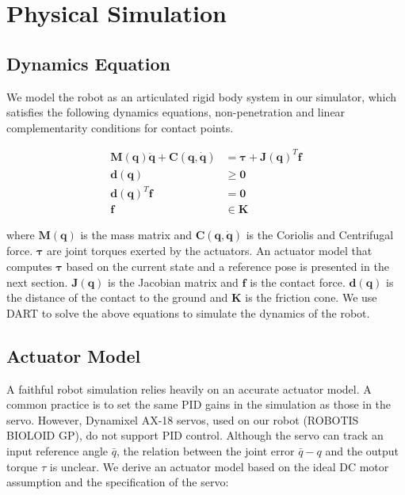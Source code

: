 \section{Physical Simulation}

\subsection{Dynamics Equation}

We model the robot as an articulated rigid body system in our simulator, which satisfies the following dynamics equations, non-penetration and linear complementarity conditions for contact points.

\begin{align}
\label{eq:robotdynamics}
\mathbf{M}(\mathbf{q})\mathbf{\ddot{q}}+\mathbf{C}(\mathbf{q},\mathbf{\dot{q}})&=\boldsymbol{\tau}+\mathbf{J}(\mathbf{q})^T\mathbf{f}\\
\nonumber \mathbf{d}(\mathbf{q})&\geq \mathbf{0}\\
\nonumber \mathbf{d}(\mathbf{q})^T\mathbf{f}&= \mathbf{0}\\
\nonumber \mathbf{f}&\in\mathbf{K}
\nonumber \end{align}

where $\mathbf{M}(\mathbf{q})$ is the mass matrix and $\mathbf{C}(\mathbf{q},\mathbf{\dot{q}})$ is the Coriolis and Centrifugal force. $\boldsymbol{\tau}$ are joint torques exerted by the actuators. An actuator model that computes $\boldsymbol{\tau}$ based on the current state and a reference pose is presented in the next section. $\mathbf{J}(\mathbf{q})$ is the Jacobian matrix and $\mathbf{f}$ is the contact force. $\mathbf{d}(\mathbf{q})$ is the distance of the contact to the ground and $\mathbf{K}$ is the friction cone. We use DART to solve the above equations to simulate the dynamics of the robot.

\subsection{Actuator Model}
\label{sec:motorDynamics}
A faithful robot simulation relies heavily on an accurate actuator model. A common practice is to set the same PID gains in the simulation as those in the servo. However, Dynamixel AX-18 servos, used on our robot (ROBOTIS BIOLOID GP), do not support PID control. Although the servo can track an input reference angle $\bar{q}$, the relation between the joint error $\bar{q}-q$ and the output torque $\tau$ is unclear. We derive an actuator model based on the ideal DC motor assumption and the specification of the servo:

